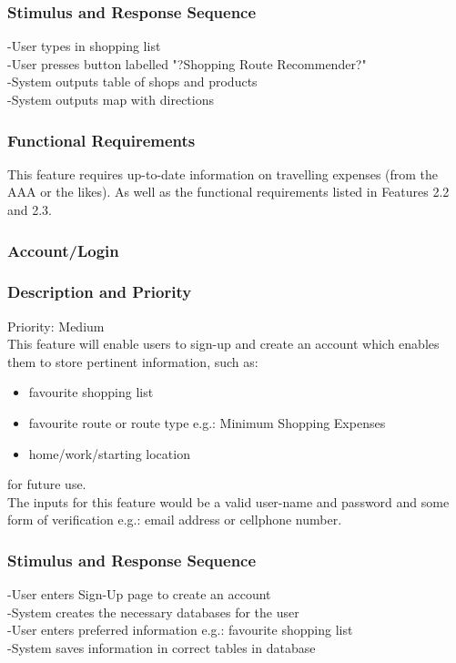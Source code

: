 \documentclass[12pt]{article}
\begin{document}
 \subsubsection*{Stimulus and Response Sequence}
 -User types in shopping list\\
-User presses button labelled "?Shopping Route Recommender?"\\
-System outputs table of shops and products\\
-System outputs map with directions\\
 \subsubsection*{Functional Requirements}
 This feature requires up-to-date information on travelling expenses (from the AAA or the likes).
 As well as the functional requirements listed in Features 2.2 and 2.3.
 \\
 \subsubsection{Account/Login}
\subsubsection*{Description and Priority}
 Priority: Medium\\
 This feature will enable users to sign-up and create an account which enables them to store pertinent information, such as:\begin{itemize}
  \item favourite shopping list
  \item favourite route or route type e.g.: Minimum Shopping Expenses
  \item home/work/starting location
\end{itemize}
for future use. \\
The inputs for this feature would be a valid user-name and password and some form of verification e.g.: email address or cellphone number. 
      
 \subsubsection*{Stimulus and Response Sequence}
-User enters Sign-Up page to create an account \\
-System creates the necessary databases for the user\\
-User enters preferred information e.g.: favourite shopping list\\
-System saves information in correct tables in database
\end{document}
